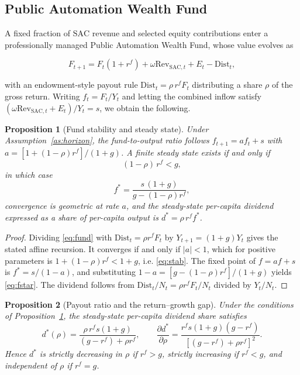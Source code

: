 \documentclass[journal]{IEEEtran}
\theoremstyle{plain}
\newtheorem{proposition}{Proposition}
\theoremstyle{definition}
\newcommand{\SAC}{\mathrm{SAC}}
\newcommand{\Rev}{\mathrm{Rev}}
\begin{document}
\subsection{Public Automation Wealth Fund}

A fixed fraction of $\SAC$ revenue and selected equity contributions enter a professionally managed Public Automation Wealth Fund, whose value evolves as

\begin{equation}
\label{eq:fund}
F_{t+1} = F_t(1+r^{f}) + \omega\Rev_{\SAC,t} + E_t - \mathrm{Dist}_t,
\end{equation}

with an endowment-style payout rule $\mathrm{Dist}_t = \rho\, r^{f} F_t$ distributing a share $\rho$ of the gross return. Writing $f_t = F_t/Y_t$ and letting the combined inflow satisfy $(\omega\Rev_{\SAC,t}+E_t)/Y_t = s$, we obtain the following.

\begin{proposition}[Fund stability and steady state]
\label{prop:fund}
Under Assumption~\ref{as:horizon}, the fund-to-output ratio follows $f_{t+1} = a f_t + s$ with $a = [1+(1-\rho)r^{f}]/(1+g)$. A finite steady state exists if and only if
\begin{equation}
\label{eq:stab}
(1-\rho)\,r^{f} < g,
\end{equation}
in which case
\begin{equation}
\label{eq:fstar}
f^{*} = \frac{s\,(1+g)}{g - (1-\rho)r^{f}},
\end{equation}
convergence is geometric at rate $a$, and the steady-state per-capita dividend expressed as a share of per-capita output is $d^{*} = \rho\,r^{f} f^{*}$.
\end{proposition}

\begin{proof}
Dividing \eqref{eq:fund} with $\mathrm{Dist}_t = \rho r^{f}F_t$ by $Y_{t+1} = (1+g)Y_t$ gives the stated affine recursion. It converges if and only if $|a|<1$, which for positive parameters is $1+(1-\rho)r^{f} < 1+g$, i.e. \eqref{eq:stab}. The fixed point of $f = af+s$ is $f^{*} = s/(1-a)$, and substituting $1-a = [g-(1-\rho)r^{f}]/(1+g)$ yields \eqref{eq:fstar}. The dividend follows from $\mathrm{Dist}_t/N_t = \rho r^{f}F_t/N_t$ divided by $Y_t/N_t$.
\end{proof}

\begin{proposition}[Payout ratio and the return--growth gap]
\label{prop:rg}
Under the conditions of Proposition~\ref{prop:fund}, the steady-state per-capita dividend share satisfies
\begin{equation}
\label{eq:dstar}
d^{*}(\rho) = \frac{\rho\, r^{f} s (1+g)}{(g-r^{f}) + \rho r^{f}}, \qquad \frac{\partial d^{*}}{\partial \rho} = \frac{r^{f}s(1+g)(g-r^{f})}{[(g-r^{f})+\rho r^{f}]^{2}} .
\end{equation}
Hence $d^{*}$ is strictly decreasing in $\rho$ if $r^{f} > g$, strictly increasing if $r^{f} < g$, and independent of $\rho$ if $r^{f} = g$.
\end{proposition}
\end{document}
